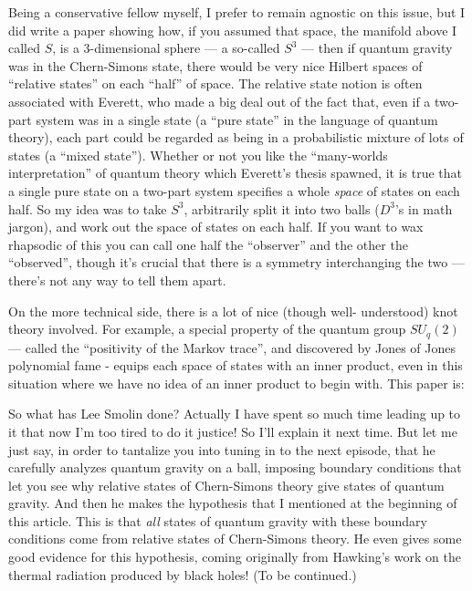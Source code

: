 \documentclass{article}
\def\tightlist{}
\renewcommand{\texttt}[1]{%
  \begingroup
  \ttfamily
  \begingroup\lccode`~=`/\lowercase{\endgroup\def~}{/\discretionary{}{}{}}%
  \begingroup\lccode`~=`[\lowercase{\endgroup\def~}{[\discretionary{}{}{}}%
  \begingroup\lccode`~=`.\lowercase{\endgroup\def~}{.\discretionary{}{}{}}%
  \catcode`/=\active\catcode`[=\active\catcode`.=\active
  \scantokens{#1\noexpand}%
  \endgroup
}
\begin{document}
Being a conservative fellow myself, I prefer to remain agnostic on this
issue, but I did write a paper showing how, if you assumed that space,
the manifold above I called \(S\), is a \(3\)-dimensional sphere --- a
so-called \(S^3\) --- then if quantum gravity was in the Chern-Simons
state, there would be very nice Hilbert spaces of ``relative states'' on
each ``half'' of space. The relative state notion is often associated
with Everett, who made a big deal out of the fact that, even if a
two-part system was in a single state (a ``pure state'' in the language
of quantum theory), each part could be regarded as being in a
probabilistic mixture of lots of states (a ``mixed state''). Whether or
not you like the ``many-worlds interpretation'' of quantum theory which
Everett's thesis spawned, it is true that a single pure state on a
two-part system specifies a whole \emph{space} of states on each half.
So my idea was to take \(S^3\), arbitrarily split it into two balls
(\(D^3\)'s in math jargon), and work out the space of states on each
half. If you want to wax rhapsodic of this you can call one half the
``observer'' and the other the ``observed'', though it's crucial that
there is a symmetry interchanging the two --- there's not any way to
tell them apart.

On the more technical side, there is a lot of nice (though well-
understood) knot theory involved. For example, a special property of the
quantum group \(SU_q(2)\) --- called the ``positivity of the Markov
trace'', and discovered by Jones of Jones polynomial fame - equips each
space of states with an inner product, even in this situation where we
have no idea of an inner product to begin with. This paper is:


So what has Lee Smolin done? Actually I have spent so much time leading
up to it that now I'm too tired to do it justice! So I'll explain it
next time. But let me just say, in order to tantalize you into tuning in
to the next episode, that he carefully analyzes quantum gravity on a
ball, imposing boundary conditions that let you see why relative states
of Chern-Simons theory give states of quantum gravity. And then he makes
the hypothesis that I mentioned at the beginning of this article. This
is that \emph{all} states of quantum gravity with these boundary
conditions come from relative states of Chern-Simons theory. He even
gives some good evidence for this hypothesis, coming originally from
Hawking's work on the thermal radiation produced by black holes! (To be
continued.)
\end{document}
